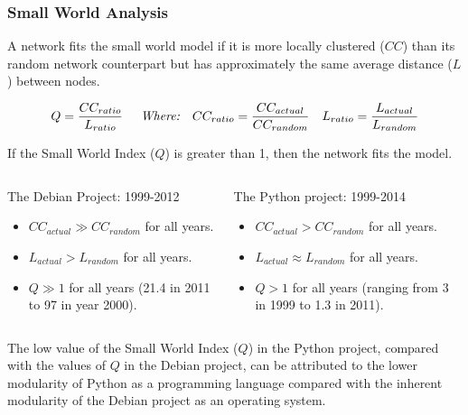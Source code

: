 \documentclass[ignorenonframetext,red,8pt,notes=show]{beamer}
\begin{document}
\begin{frame}
\frametitle{Small World Analysis}

A network fits the small world model if it is more locally clustered ($CC$) than its random network counterpart but has approximately the same average distance ($L$) between nodes. 

\begin{align}
Q = \frac{CC_{ratio}}{L_{ratio}} \nonumber & \hspace{0.5cm} \textit{Where:} & 
CC_{ratio}& = \frac{CC_{actual}}{CC_{random}} \nonumber &
L_{ratio}& = \frac{L_{actual}}{L_{random}} \nonumber \\
\end{align}

If the Small World Index ($Q$) is greater than 1, then the network fits the model. 

\begin{columns}[c]
\begin{column}{0.5\textwidth}
\begin{block}{The Debian Project: 1999-2012}
\begin{itemize}
\item $CC_{actual} \gg CC_{random}$ for all years.
\item $L_{actual} > L_{random}$ for all years.
\item $Q \gg 1$ for all years (21.4 in 2011 to 97 in year 2000).
\end{itemize}
\end{block}
\end{column}

\begin{column}{0.5\textwidth}
\begin{block}{The Python project: 1999-2014}
\begin{itemize}
\item $CC_{actual} > CC_{random}$ for all years.
\item $L_{actual} \approx L_{random}$ for all years.
\item $Q > 1$ for all years (ranging from 3 in 1999 to 1.3 in 2011).
\end{itemize}
\end{block}
\end{column}
\end{columns}

\vspace{0.3cm}

The low value of the Small World Index ($Q$) in the Python project, compared with the values of $Q$ in the Debian project, can be attributed to the lower modularity of Python as a programming language compared with the inherent modularity of the Debian project as an operating system.

\end{frame}
\end{document}
